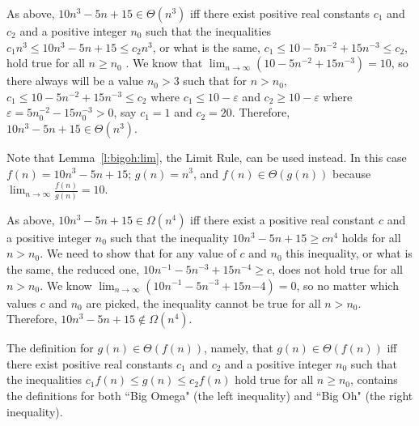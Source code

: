 As above, 
$10n^3-5n+15 \in \Theta(n^3)$ iff there exist positive real constants $c_1$ and $c_2$ 
and a positive integer $n_0$
such that the inequalities
\(c_1n^3 \leq 10n^3-5n+15 \leq c_2n^3\), or what is the same, 
\(c_1 \leq 10-5n^{-2}+15n^{-3} \leq c_2\), hold true
for all $n \ge n_0$ . We know that \(\lim_{n \rightarrow \infty}(10-5n^{-2}+15n^{-3})=10\), 
so there always will be a value  \(n_0 > 3 \) such that 
for \(n>n_0\), \( c_1\leq 10-5n^{-2}+15n^{-3} \leq c_2\) where
\(c_1 \leq 10 - \varepsilon\) and \(c_2 \geq 10 - \varepsilon\) where
$\varepsilon = 5n^{-2}_0 - 15n^{-3}_0 > 0$,
say \(c_1=1\) and \( c_2=20\). Therefore, $10n^3-5n+15 \in \Theta(n^3)$.

Note that Lemma~\ref{l:bigoh:lim}, the Limit Rule, can be used instead. In this case 
\(f(n) = 10n^3-5n+15\); \(g(n)=n^3\), and  \(f(n) \in \Theta(g(n))\) because
\(\lim_{n \rightarrow \infty}\frac{f(n)}{g(n)}=10\). 

{}%
As above, $10n^3-5n+15 \in \Omega(n^4)$ iff there exist a positive real constant 
$c$ and a positive integer $n_0$
such that the inequality $10n^3-5n+15 \geq c n^4$ holds for all $n > n_0$. 
We need to show that 
for any value of \(c\) and \(n_0\) this inequality, or what is the same, the reduced one,
\(10n^{-1}-5n^{-3}+15n^{-4}\geq c\), does not hold true for all \(n > n_0\). We know 
\(\lim_{n \rightarrow \infty}(10n^{-1}-5n^{-3}+15n{-4})=0\), 
so no matter which values \(c\) and \(n_0\) are picked, the inequality cannot be true for 
all \(n > n_0\). 
Therefore, $10n^3-5n+15 \notin \Omega(n^4)$.

The definition for \(g(n) \in \Theta(f(n))\), namely, that
\(g(n) \in \Theta(f(n))\) iff there exist positive real constants $c_1$ and $c_2$ and a 
positive integer
 $n_0$ such that the inequalities  \(c_1f(n)\leq g(n)\leq c_2f(n)\) hold true for 
all $n\geq n_0$,
contains the definitions for both ``Big Omega" (the left inequality) and 
``Big Oh" (the right inequality).
\fi

